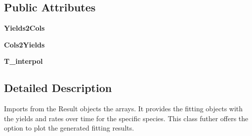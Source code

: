 \subsection*{\-Public \-Attributes}
\begin{DoxyCompactItemize}
\item 
\hypertarget{classFit__one__run_1_1Fit__one__run_acf67bf83bc9f52da3016c0a3ac4e7d6e}{{\bfseries \-Yields2\-Cols}}\label{classFit__one__run_1_1Fit__one__run_acf67bf83bc9f52da3016c0a3ac4e7d6e}

\item 
\hypertarget{classFit__one__run_1_1Fit__one__run_a8ee791dadf161472873fcc3285b8b880}{{\bfseries \-Cols2\-Yields}}\label{classFit__one__run_1_1Fit__one__run_a8ee791dadf161472873fcc3285b8b880}

\item 
\hypertarget{classFit__one__run_1_1Fit__one__run_a408a65ffcdf4c28001ef91bf534ae05a}{{\bfseries \-T\-\_\-interpol}}\label{classFit__one__run_1_1Fit__one__run_a408a65ffcdf4c28001ef91bf534ae05a}

\end{DoxyCompactItemize}


\subsection{\-Detailed \-Description}
\begin{DoxyVerb}Imports from the Result objects the arrays. It provides the fitting objects with the yields and rates over time for the specific species. This class futher offers the option to plot the generated fitting results.\end{DoxyVerb}
 

